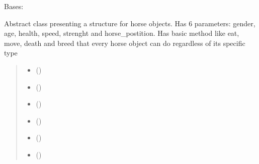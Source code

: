 \documentclass[letterpaper,10pt,english]{sphinxmanual}
\begin{document}
\begin{fulllineitems}
\label{\detokenize{main_package:main_package.Horse.Horse}}
\pysigstartsignatures
{}
\pysigstopsignatures
\sphinxAtStartPar
Bases: 

\sphinxAtStartPar
Abstract class presenting a structure for horse objects. Has 6 parameters: gender, age, health, speed, strenght
and horse\_postition. Has basic method like eat, move, death and breed that every horse object can do regardless of
its specific type
\begin{quote}\begin{description}
\begin{itemize}
\item {} 
\sphinxAtStartPar
{} ()

\item {} 
\sphinxAtStartPar
{} ()

\item {} 
\sphinxAtStartPar
{} ()

\item {} 
\sphinxAtStartPar
{} ()

\item {} 
\sphinxAtStartPar
{} ()

\item {} 
\sphinxAtStartPar
{} ()

\end{itemize}

\end{description}\end{quote}


\end{fulllineitems}
\end{document}

